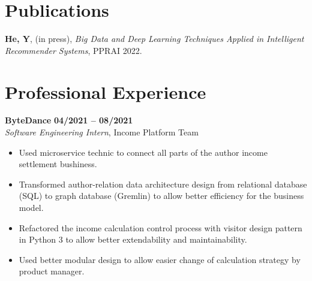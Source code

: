 \documentclass[margin,line]{res}
\begin{document}
\begin{resume}
%



\section{\sc Publications}
\textbf{He, Y}, (in press), \textit{Big Data and Deep Learning Techniques Applied in Intelligent Recommender Systems}, PPRAI 2022.
\vspace*{-.1in}

\section{\sc Professional Experience}

{\bf ByteDance} \hfill {\bf 04/2021 -- 08/2021} \\
\textit{Software Engineering Intern}, {Income Platform Team}
\begin{itemize}
	\item Used microservice technic to connect all parts of the author income settlement bushiness.
	\item Transformed author-relation data architecture design from relational database (SQL) to graph database (Gremlin) to allow better efficiency for the business model.
	\item Refactored the income calculation control process with visitor design pattern in Python 3 to allow better extendability and maintainability.
	\item Used better modular design to allow easier change of calculation strategy by product manager.
\end{itemize}


\end{resume}
\end{document}
